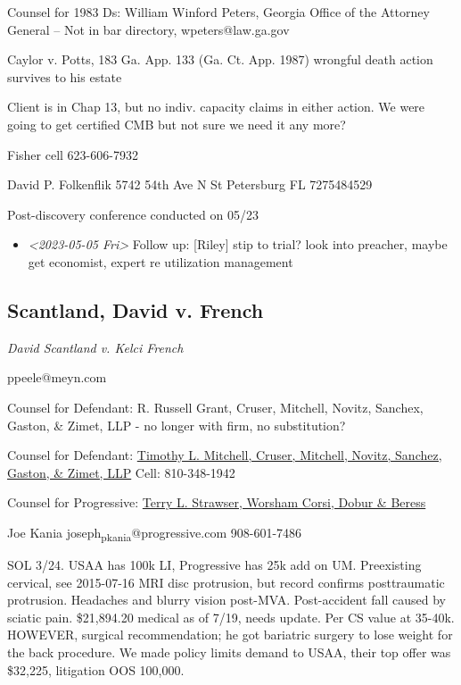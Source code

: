 \documentclass[11pt]{article}
\begin{document}
Counsel for 1983 Ds: William Winford Peters, Georgia Office of the Attorney General -- Not in bar directory, wpeters@law.ga.gov

Caylor v. Potts, 183 Ga. App. 133 (Ga. Ct. App. 1987) wrongful death action survives to his estate

Client is in Chap 13, but no indiv. capacity claims in either action. We were going to get certified CMB but not sure we need it any more?

Fisher cell 623-606-7932

David P. Folkenflik
5742 54th Ave N
St Petersburg FL
7275484529

Post-discovery conference conducted on 05/23

\begin{itemize}
\item \textit{<2023-05-05 Fri> } Follow up: [Riley] stip to trial? look into preacher, maybe get economist, expert re utilization management
\end{itemize}

\subsection*{Scantland, David v. French}
\label{sec:orgc9e05f3}

\emph{David Scantland v. Kelci French}

ppeele@meyn.com

Counsel for Defendant: R. Russell Grant, Cruser, Mitchell, Novitz, Sanchex, Gaston, \& Zimet, LLP - no longer with firm, no substitution?

Counsel for Defendant: \href{https://gabar.reliaguide.com/lawyer/30092-GA-Timothy-Mitchell-276517}{Timothy L. Mitchell, Cruser, Mitchell, Novitz, Sanchez, Gaston, \& Zimet, LLP} Cell: 810-348-1942

Counsel for Progressive: \href{https://gabar.reliaguide.com/lawyer/30308-GA-Terry-Strawser-256088}{Terry L. Strawser, Worsham Corsi, Dobur \& Beress}

Joe Kania joseph\textsubscript{p}\textsubscript{kania}@progressive.com 908-601-7486

SOL 3/24. USAA has 100k LI, Progressive has 25k add on UM. Preexisting cervical, see 2015-07-16 MRI disc protrusion, but record confirms posttraumatic protrusion. Headaches and blurry vision post-MVA. Post-accident fall caused by sciatic pain. \$21,894.20 medical as of 7/19, needs update. Per CS value at 35-40k. HOWEVER, surgical recommendation; he got bariatric surgery to lose weight for the back procedure. We made policy limits demand to USAA, their top offer was \$32,225, litigation OOS 100,000. 
\end{document}
